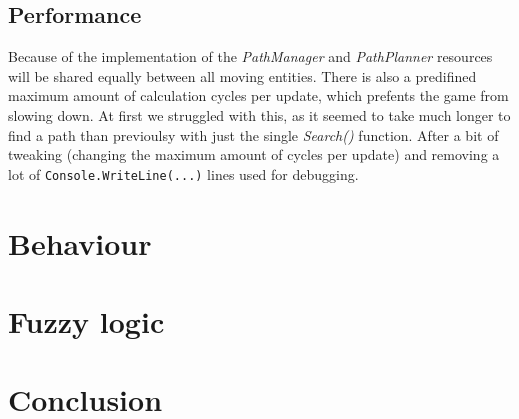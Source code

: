 \documentclass[11pt]{article}
\begin{document}
    
    \subsection{Performance}\label{subsec:pathperformance}
    Because of the implementation of the \textit{PathManager} and \textit{PathPlanner} resources will be shared equally between all moving entities.
    There is also a predifined maximum amount of calculation cycles per update, which prefents the game from slowing down.
    At first we struggled with this, as it seemed to take much longer to find a path than previoulsy with just the single \textit{Search()} function.
    After a bit of tweaking (changing the maximum amount of cycles per update) and removing a lot of \lstinline[columns=fixed]{Console.WriteLine(...)}
    lines used for debugging.
    
    \newpage
    \section{Behaviour}\label{sec:behaviour}
    
    \newpage
    \section{Fuzzy logic}\label{sec:fuzzyLogic}

    \newpage
    \section{Conclusion}\label{sec:conclusion}

    \newpage

    
    
\end{document}
